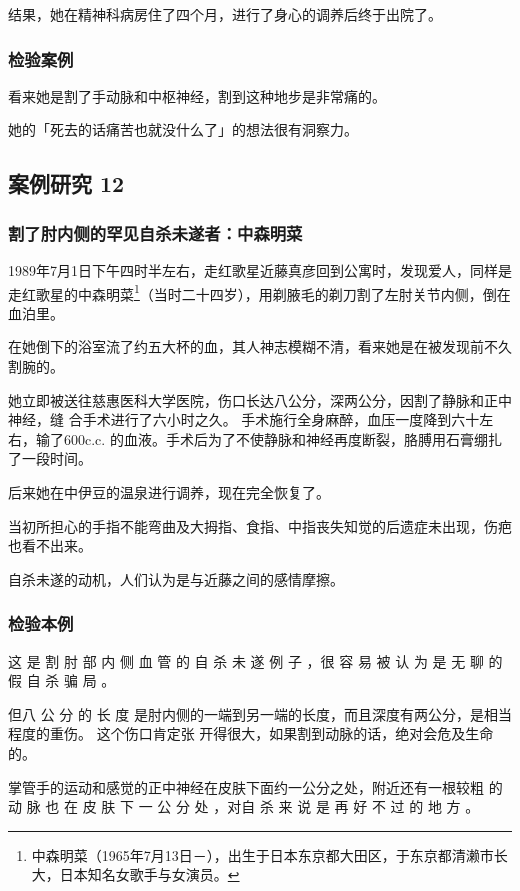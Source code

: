 \documentclass[UTF8]{ctexart}
\begin{document}
结果，她在精神科病房住了四个月，进行了身心的调养后终于出院了。

\subsubsection*{检验案例}

看来她是割了手动脉和中枢神经，割到这种地步是非常痛的。

她的「死去的话痛苦也就没什么了」的想法很有洞察力。

\subsection{案例研究 12}
\subsubsection*{割了肘内侧的罕见自杀未遂者：中森明菜}

1989年7月1日下午四时半左右，走红歌星近藤真彦回到公寓时，发现爱人，同样是走红歌星的中森明菜\footnote{中森明菜（1965年7月13日－\qquad \qquad ），出生于日本东京都大田区，于东京都清濑市长大，日本知名女歌手与女演员。}（当时二十四岁），用剃腋毛的剃刀割了左肘关节内侧，倒在血泊里。

在她倒下的浴室流了约五大杯的血，其人神志模糊不清，看来她是在被发现前不久割腕的。

她立即被送往慈惠医科大学医院，伤口长达八公分，深两公分，因割了静脉和正中神经，缝 合手术进行了六小时之久。
手术施行全身麻醉，血压一度降到六十左右，输了$600$c.c. 的血液。手术后为了不使静脉和神经再度断裂，胳膊用石膏绷扎了一段时间。 

后来她在中伊豆的温泉进行调养，现在完全恢复了。

当初所担心的手指不能弯曲及大拇指、食指、中指丧失知觉的后遗症未出现，伤疤也看不出来。

自杀未遂的动机，人们认为是与近藤之间的感情摩擦。

\subsubsection*{检验本例}

这 是 割 肘 部 内 侧 血 管 的 自 杀 未 遂 例 子 ，很 容 易 被 认 为 是 无 聊 的 假 自 杀 骗 局 。

但八 公 分 的 长 度 是肘内侧的一端到另一端的长度，而且深度有两公分，是相当程度的重伤。
这个伤口肯定张 开得很大，如果割到动脉的话，绝对会危及生命的。 

掌管手的运动和感觉的正中神经在皮肤下面约一公分之处，附近还有一根较粗 的 动 脉 也 在 皮 肤 下 一 公 分 处 ，对自 杀 来 说 是 再 好 不 过 的 地 方 。
\end{document}

